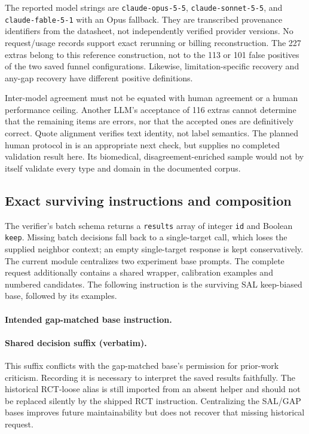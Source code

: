 The reported model strings are \texttt{claude-opus-5-5}, \texttt{claude-sonnet-5-5}, and
\texttt{claude-fable-5-1} with an Opus fallback. They are transcribed provenance identifiers
from the datasheet, not independently verified provider versions. No request/usage records
support exact rerunning or billing reconstruction. The 227 extras belong to this reference
construction, not to the 113 or 101 false positives of the two saved funnel configurations.
Likewise, limitation-specific recovery and any-gap recovery have different positive definitions.

Inter-model agreement must not be equated with human agreement or a human performance ceiling.
Another LLM's acceptance of 116 extras cannot determine that the remaining items are errors,
nor that the accepted ones are definitively correct. Quote alignment verifies text identity,
not label semantics. The planned human protocol in  is an appropriate
next check, but supplies no completed validation result here. Its biomedical, disagreement-enriched
sample would not by itself validate every type and domain in the documented corpus.

\subsection{Exact surviving instructions and composition}
\label{A:prompts}

The verifier's batch schema returns a \texttt{results} array of integer \texttt{id} and Boolean
\texttt{keep}. Missing batch decisions fall back to a single-target call, which loses the supplied
neighbor context; an empty single-target response is kept conservatively. The current module
centralizes two experiment base prompts. The complete request additionally contains a shared
wrapper, calibration examples and numbered candidates. The following instruction is the surviving
SAL keep-biased base, followed by its examples.



\paragraph{Intended gap-matched base instruction.}


\paragraph{Shared decision suffix (verbatim).}
\begin{quote}\small

\end{quote}
This suffix conflicts with the gap-matched base's permission for prior-work criticism. Recording
it is necessary to interpret the saved results faithfully. The historical RCT-loose alias is
still imported from an absent helper and should not be replaced silently by the shipped RCT
instruction. Centralizing the SAL/GAP bases improves future maintainability but does not recover
that missing historical request.

